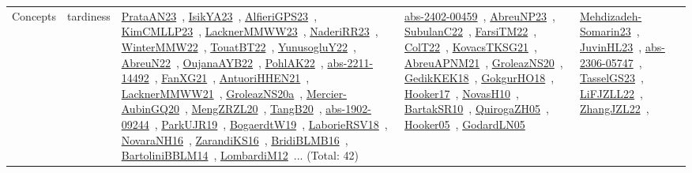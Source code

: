 {\begin{longtable}{lp{3cm}>{\raggedright\arraybackslash}p{6cm}>{\raggedright\arraybackslash}p{6cm}>{\raggedright\arraybackslash}p{8cm}}
Concepts & tardiness & \href{works/PrataAN23.pdf}{PrataAN23}~\cite{PrataAN23}, \href{works/IsikYA23.pdf}{IsikYA23}~\cite{IsikYA23}, \href{works/AlfieriGPS23.pdf}{AlfieriGPS23}~\cite{AlfieriGPS23}, \href{works/KimCMLLP23.pdf}{KimCMLLP23}~\cite{KimCMLLP23}, \href{works/LacknerMMWW23.pdf}{LacknerMMWW23}~\cite{LacknerMMWW23}, \href{works/NaderiRR23.pdf}{NaderiRR23}~\cite{NaderiRR23}, \href{works/WinterMMW22.pdf}{WinterMMW22}~\cite{WinterMMW22}, \href{works/TouatBT22.pdf}{TouatBT22}~\cite{TouatBT22}, \href{works/YunusogluY22.pdf}{YunusogluY22}~\cite{YunusogluY22}, \href{works/AbreuN22.pdf}{AbreuN22}~\cite{AbreuN22}, \href{works/OujanaAYB22.pdf}{OujanaAYB22}~\cite{OujanaAYB22}, \href{works/PohlAK22.pdf}{PohlAK22}~\cite{PohlAK22}, \href{works/abs-2211-14492.pdf}{abs-2211-14492}~\cite{abs-2211-14492}, \href{works/FanXG21.pdf}{FanXG21}~\cite{FanXG21}, \href{works/AntuoriHHEN21.pdf}{AntuoriHHEN21}~\cite{AntuoriHHEN21}, \href{works/LacknerMMWW21.pdf}{LacknerMMWW21}~\cite{LacknerMMWW21}, \href{works/GroleazNS20a.pdf}{GroleazNS20a}~\cite{GroleazNS20a}, \href{works/Mercier-AubinGQ20.pdf}{Mercier-AubinGQ20}~\cite{Mercier-AubinGQ20}, \href{works/MengZRZL20.pdf}{MengZRZL20}~\cite{MengZRZL20}, \href{works/TangB20.pdf}{TangB20}~\cite{TangB20}, \href{works/abs-1902-09244.pdf}{abs-1902-09244}~\cite{abs-1902-09244}, \href{works/ParkUJR19.pdf}{ParkUJR19}~\cite{ParkUJR19}, \href{works/BogaerdtW19.pdf}{BogaerdtW19}~\cite{BogaerdtW19}, \href{works/LaborieRSV18.pdf}{LaborieRSV18}~\cite{LaborieRSV18}, \href{works/NovaraNH16.pdf}{NovaraNH16}~\cite{NovaraNH16}, \href{works/ZarandiKS16.pdf}{ZarandiKS16}~\cite{ZarandiKS16}, \href{works/BridiBLMB16.pdf}{BridiBLMB16}~\cite{BridiBLMB16}, \href{works/BartoliniBBLM14.pdf}{BartoliniBBLM14}~\cite{BartoliniBBLM14}, \href{works/LombardiM12.pdf}{LombardiM12}~\cite{LombardiM12}... (Total: 42) & \href{works/abs-2402-00459.pdf}{abs-2402-00459}~\cite{abs-2402-00459}, \href{works/AbreuNP23.pdf}{AbreuNP23}~\cite{AbreuNP23}, \href{works/SubulanC22.pdf}{SubulanC22}~\cite{SubulanC22}, \href{works/FarsiTM22.pdf}{FarsiTM22}~\cite{FarsiTM22}, \href{works/ColT22.pdf}{ColT22}~\cite{ColT22}, \href{works/KovacsTKSG21.pdf}{KovacsTKSG21}~\cite{KovacsTKSG21}, \href{works/AbreuAPNM21.pdf}{AbreuAPNM21}~\cite{AbreuAPNM21}, \href{works/GroleazNS20.pdf}{GroleazNS20}~\cite{GroleazNS20}, \href{works/GedikKEK18.pdf}{GedikKEK18}~\cite{GedikKEK18}, \href{works/GokgurHO18.pdf}{GokgurHO18}~\cite{GokgurHO18}, \href{works/Hooker17.pdf}{Hooker17}~\cite{Hooker17}, \href{works/NovasH10.pdf}{NovasH10}~\cite{NovasH10}, \href{works/BartakSR10.pdf}{BartakSR10}~\cite{BartakSR10}, \href{works/QuirogaZH05.pdf}{QuirogaZH05}~\cite{QuirogaZH05}, \href{works/Hooker05.pdf}{Hooker05}~\cite{Hooker05}, \href{works/GodardLN05.pdf}{GodardLN05}~\cite{GodardLN05} & \href{works/Mehdizadeh-Somarin23.pdf}{Mehdizadeh-Somarin23}~\cite{Mehdizadeh-Somarin23}, \href{works/JuvinHL23.pdf}{JuvinHL23}~\cite{JuvinHL23}, \href{works/abs-2306-05747.pdf}{abs-2306-05747}~\cite{abs-2306-05747}, \href{works/TasselGS23.pdf}{TasselGS23}~\cite{TasselGS23}, \href{works/LiFJZLL22.pdf}{LiFJZLL22}~\cite{LiFJZLL22}, \href{works/ZhangJZL22.pdf}{ZhangJZL22}~\cite{ZhangJZL22}, 
\end{longtable}}

